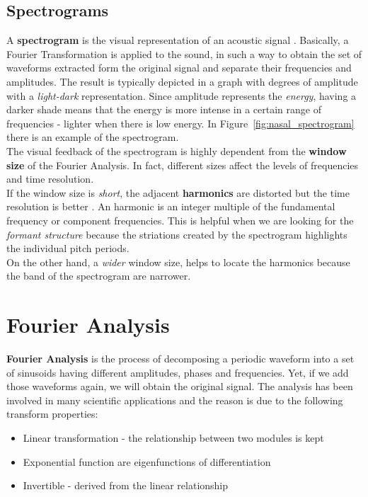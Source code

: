 \subsection{Spectrograms}
\label{sec:spectrograms}
A \textbf{spectrogram} is the visual representation of an acoustic signal \cite{spectrogram_def}. Basically, a Fourier Transformation is applied to the sound, in such a way to obtain the set of waveforms extracted form the original signal and separate their frequencies and amplitudes. The result is typically depicted in a graph with degrees of amplitude with a \textit{light-dark} representation. Since amplitude represents the \textit{energy}, having a darker shade means that the energy is more intense in a certain range of frequencies - lighter when there is low energy. In Figure~\ref{fig:nasal_spectrogram} there is an example of the spectrogram. \\
\noindent The visual feedback of the spectrogram is highly dependent from the \textbf{window size} of the Fourier Analysis. In fact, different sizes affect the levels of frequencies and time resolution. \\
\noindent If the window size is \textit{short}, the adjacent \textbf{harmonics} are distorted but the time resolution is better \cite{spectrogram_def}. An harmonic is an integer multiple of the fundamental frequency or component frequencies. This is helpful when we are looking for the \textit{formant structure} because the striations created by the spectrogram highlights the individual pitch periods. \\
\noindent On the other hand, a \textit{wider} window size, helps to locate the harmonics because the band of the spectrogram are narrower.


\section{Fourier Analysis}
\label{sec:fourier_analysis}
\textbf{Fourier Analysis} is the process of decomposing a periodic waveform into a set of sinusoids having different amplitudes, phases and frequencies. Yet, if we add those waveforms again, we will obtain the original signal. The analysis has been involved in many scientific applications and the reason is due to the following transform properties:

\begin{itemize}
	\item Linear transformation - the relationship between two modules is kept
	\item Exponential function are eigenfunctions of differentiation \cite{evans1997partial}
	\item Invertible - derived from the linear relationship
\end{itemize}

